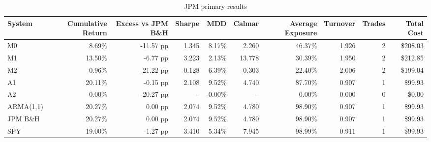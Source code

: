\begin{table}[htbp]
\centering
\small
\caption{JPM primary results}
\label{tab:jpm-primary}
\begin{tabular}{lrrrrrrrrr}
\toprule
System & Cumulative Return & Excess vs JPM B\&H & Sharpe & MDD & Calmar & Average Exposure & Turnover & Trades & Total Cost \\
\midrule
M0 & 8.69\% & -11.57 pp & 1.345 & 8.17\% & 2.260 & 46.37\% & 1.926 & 2 & \$208.03 \\
M1 & 13.50\% & -6.77 pp & 3.223 & 2.13\% & 13.778 & 30.39\% & 1.950 & 2 & \$212.85 \\
M2 & -0.96\% & -21.22 pp & -0.128 & 6.39\% & -0.303 & 22.40\% & 2.006 & 2 & \$199.04 \\
A1 & 20.11\% & -0.15 pp & 2.108 & 9.52\% & 4.740 & 87.70\% & 0.907 & 1 & \$99.93 \\
A2 & 0.00\% & -20.27 pp & -- & -0.00\% & -- & 0.00\% & 0.000 & 0 & \$0.00 \\
ARMA(1,1) & 20.27\% & 0.00 pp & 2.074 & 9.52\% & 4.780 & 98.90\% & 0.907 & 1 & \$99.93 \\
JPM B\&H & 20.27\% & 0.00 pp & 2.074 & 9.52\% & 4.780 & 98.90\% & 0.907 & 1 & \$99.93 \\
SPY & 19.00\% & -1.27 pp & 3.410 & 5.34\% & 7.945 & 98.99\% & 0.911 & 1 & \$99.93 \\
\bottomrule
\end{tabular}
\end{table}
